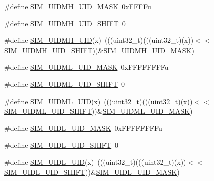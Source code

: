 \begin{DoxyCompactItemize}
\item 
\#define \hyperlink{group___s_i_m___register___masks_ga38dffcb27b09a015e2f2e7812d42477c}{S\+I\+M\+\_\+\+U\+I\+D\+M\+H\+\_\+\+U\+I\+D\+\_\+\+M\+A\+SK}~0x\+F\+F\+F\+Fu
\item 
\#define \hyperlink{group___s_i_m___register___masks_ga56b83da182908eb5c406181b72870e54}{S\+I\+M\+\_\+\+U\+I\+D\+M\+H\+\_\+\+U\+I\+D\+\_\+\+S\+H\+I\+FT}~0
\item 
\#define \hyperlink{group___s_i_m___register___masks_ga62269c010d4ee5e3036fea63bbe21702}{S\+I\+M\+\_\+\+U\+I\+D\+M\+H\+\_\+\+U\+ID}(x)~(((uint32\+\_\+t)(((uint32\+\_\+t)(x))$<$$<$\hyperlink{group___s_i_m___register___masks_ga56b83da182908eb5c406181b72870e54}{S\+I\+M\+\_\+\+U\+I\+D\+M\+H\+\_\+\+U\+I\+D\+\_\+\+S\+H\+I\+FT}))\&\hyperlink{group___s_i_m___register___masks_ga38dffcb27b09a015e2f2e7812d42477c}{S\+I\+M\+\_\+\+U\+I\+D\+M\+H\+\_\+\+U\+I\+D\+\_\+\+M\+A\+SK})
\item 
\#define \hyperlink{group___s_i_m___register___masks_ga87fba538d2482490ddfdb1ef8a44ec66}{S\+I\+M\+\_\+\+U\+I\+D\+M\+L\+\_\+\+U\+I\+D\+\_\+\+M\+A\+SK}~0x\+F\+F\+F\+F\+F\+F\+F\+Fu
\item 
\#define \hyperlink{group___s_i_m___register___masks_gacedaca5a049852ee395767e70f806c14}{S\+I\+M\+\_\+\+U\+I\+D\+M\+L\+\_\+\+U\+I\+D\+\_\+\+S\+H\+I\+FT}~0
\item 
\#define \hyperlink{group___s_i_m___register___masks_ga0eb63e00b9ee42283435043b437b8d29}{S\+I\+M\+\_\+\+U\+I\+D\+M\+L\+\_\+\+U\+ID}(x)~(((uint32\+\_\+t)(((uint32\+\_\+t)(x))$<$$<$\hyperlink{group___s_i_m___register___masks_gacedaca5a049852ee395767e70f806c14}{S\+I\+M\+\_\+\+U\+I\+D\+M\+L\+\_\+\+U\+I\+D\+\_\+\+S\+H\+I\+FT}))\&\hyperlink{group___s_i_m___register___masks_ga87fba538d2482490ddfdb1ef8a44ec66}{S\+I\+M\+\_\+\+U\+I\+D\+M\+L\+\_\+\+U\+I\+D\+\_\+\+M\+A\+SK})
\item 
\#define \hyperlink{group___s_i_m___register___masks_ga412340eabbcd0f0d48ce4886e9beb071}{S\+I\+M\+\_\+\+U\+I\+D\+L\+\_\+\+U\+I\+D\+\_\+\+M\+A\+SK}~0x\+F\+F\+F\+F\+F\+F\+F\+Fu
\item 
\#define \hyperlink{group___s_i_m___register___masks_ga6fb1383717ebfa6f47b5a5952fd21d63}{S\+I\+M\+\_\+\+U\+I\+D\+L\+\_\+\+U\+I\+D\+\_\+\+S\+H\+I\+FT}~0
\item 
\#define \hyperlink{group___s_i_m___register___masks_ga636c37811a4a8c9a57df79fd1790b800}{S\+I\+M\+\_\+\+U\+I\+D\+L\+\_\+\+U\+ID}(x)~(((uint32\+\_\+t)(((uint32\+\_\+t)(x))$<$$<$\hyperlink{group___s_i_m___register___masks_ga6fb1383717ebfa6f47b5a5952fd21d63}{S\+I\+M\+\_\+\+U\+I\+D\+L\+\_\+\+U\+I\+D\+\_\+\+S\+H\+I\+FT}))\&\hyperlink{group___s_i_m___register___masks_ga412340eabbcd0f0d48ce4886e9beb071}{S\+I\+M\+\_\+\+U\+I\+D\+L\+\_\+\+U\+I\+D\+\_\+\+M\+A\+SK})
$$
\end{DoxyCompactItemize}
